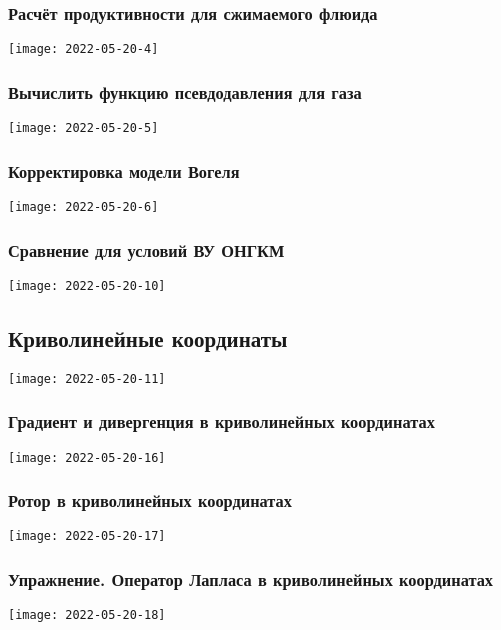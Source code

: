 \documentclass[main.tex]{subfiles}
\begin{document}
\subsubsection{Расчёт продуктивности для сжимаемого флюида}
\texttt{[image: 2022-05-20-4]}

\subsubsection{Вычислить функцию псевдодавления для газа}
\texttt{[image: 2022-05-20-5]}

\subsubsection{Корректировка модели Вогеля}
\texttt{[image: 2022-05-20-6]}




\subsubsection{Сравнение для условий ВУ ОНГКМ}
\texttt{[image: 2022-05-20-10]}


\subsection{Криволинейные координаты}
\texttt{[image: 2022-05-20-11]}





\subsubsection{Градиент и дивергенция в криволинейных координатах}
\texttt{[image: 2022-05-20-16]}

\subsubsection{Ротор в криволинейных координатах}
\texttt{[image: 2022-05-20-17]}

\subsubsection{Упражнение. Оператор Лапласа в криволинейных координатах}
\texttt{[image: 2022-05-20-18]}
\end{document}
